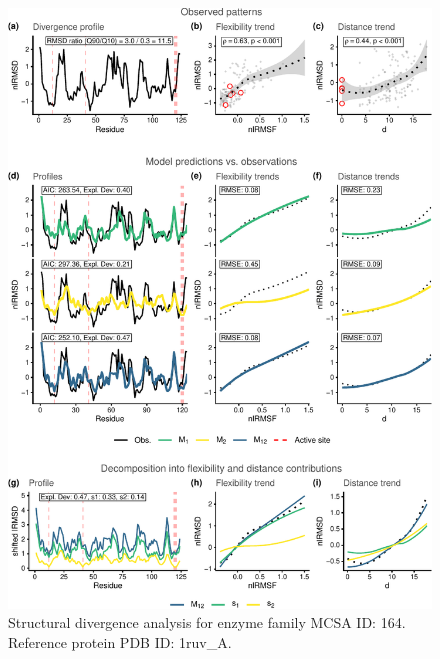 \documentclass[
]{article}
\begin{document}
\clearpage
\begin{figure}[H]
\centering


\begin{center}\includegraphics{supplementary_material_files/figure-latex/generate_figures-9} \end{center}

\caption{Structural divergence analysis for enzyme family MCSA ID: 164. Reference protein PDB ID: 1ruv\_A.}
\end{figure}
\end{document}
